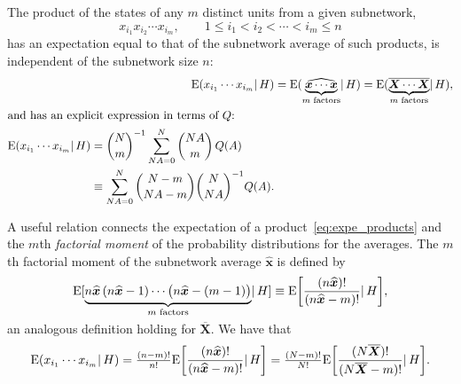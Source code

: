\documentclass{article}
\newcommand*{\citep}{\parencites}
\theoremstyle{innote}
\newcommand*{\av}{\overline} %
\newcommand*{\sav}{\widehat} %
\newcommand*{\yx}{\bm{x}}%
\newcommand*{\yxs}{\sav{\yx}}%
\newcommand*{\yX}{\bm{X}}%
\newcommand*{\yXf}{\av{\yX}}%
\newcommand*{\yH}{\varEta}
\newcommand*{\cond}%
{\mathpunct{|}}%
\renewcommand{\le}{\leqslant}%
\renewcommand*{\|}{\cond}
\newcommand*{\+}{\lor}
\let\varEta H
\newcommand*{\E}{\mathrm{E}}
\DeclarePairedDelimiter\expp{(}{)}
\newcommand*{\expe}{\E\expp}%
\newcommand*{\expeb}{\E\clcl}%
\DeclarePairedDelimiter\clcl{[}{]}
\begin{document}
\begin{asparaenum}
\medskip
\item\label{item:moments}The product of the states of any $m$ distinct
  units from a given subnetwork,
  \begin{equation*}
    x_{i_1} x_{i_2} \dotsm x_{i_m},
    \qquad 1\le i_1 < i_2 < \dotsb < i_m \le n
  \end{equation*}
  has an expectation equal to that of the subnetwork average of such
  products, is independent of the subnetwork size $n$:
\begin{subequations}
\label{eq:expe_products}
\begin{align}
  \expe{x_{i_1} \dotsm x_{i_m} \cond \yH}
&=
\expe{\sav{\underbrace{\yx \dotsm \yx}_{\text{$m$ factors}}} \cond \yH}
=
\expe{\av{\underbrace{\yX \dotsm \yX}_{\text{$m$ factors}}} \cond \yH},
\\
\intertext{and has an explicit expression in terms of $Q$:}
  \begin{split}
\expe{x_{i_1} \dotsm x_{i_m} \cond \yH}
&=
\binom{N}{m}^{-1}
\sum_{N A=0}^N %
\binom{N A}{m}\, Q(A)
\\
&\equiv
\sum_{N A=0}^N %
\binom{N-m}{N A-m}
\binom{N}{N A}^{-1} Q(A).
\end{split}
\end{align}
\end{subequations}
\end{asparaenum}

\medskip


A useful relation connects the expectation of a
product~\eqref{eq:expe_products} and the $m$th \emph{factorial moment}
\citep{potts1953} of the probability distributions for the averages. The
$m$th factorial moment of the subnetwork average $\yxs$ is defined by
\begin{equation}
  \label{eq:fact_mom_defin}
\vphantom{\underbrace{\yxs}_{m}}\expeb*{
\smash{\underbrace{n\yxs\,(n\yxs-1)\dotsm \bigl(n\yxs-(m-1)\bigr)}_{\text{$m$ factors}}}
\cond \yH}
\equiv \expeb*{\frac{(n\yxs)!}{(n\yxs-m)!} \cond \yH},
\end{equation}
an analogous definition holding for $\yXf$. We have that
\begin{equation}
  \label{eq:eq_factmom_prod}
\expe{x_{i_1} \dotsm x_{i_m} \cond \yH}
=
  \tfrac{(n-m)!}{n!}\expeb*{\frac{(n\yxs)!}{(n\yxs-m)!} \cond \yH}
=
  \tfrac{(N-m)!}{N!}\expeb*{\frac{(N\yXf)!}{(N\yXf-m)!} \cond \yH}.
\end{equation}
\end{document}
